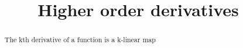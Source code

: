 \documentclass{ximera}
\title{Higher order derivatives}
\begin{document}
\begin{abstract}
	The kth derivative of a function is a k-linear map
\end{abstract}
\end{document}
